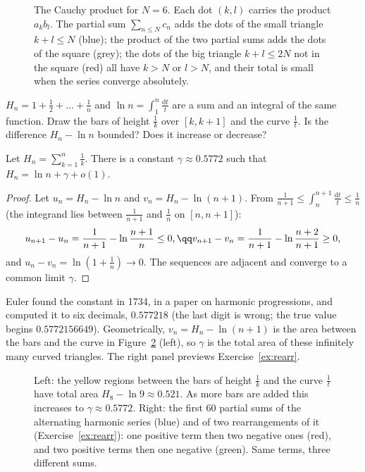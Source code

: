 \begin{figure}[ht]
\centering
{}
\caption{The Cauchy product for $N=6$. Each dot $(k,l)$ carries the product $a_kb_l$. The partial sum $\sum_{n\le N}c_n$ adds the dots of the small triangle $k+l\le N$ (blue); the product of the two partial sums adds the dots of the square (grey); the dots of the big triangle $k+l\le2N$ not in the square (red) all have $k>N$ or $l>N$, and their total is small when the series converge absolutely.}
\label{fig:cauchyprod}
\end{figure}

\begin{think}
$H_n=1+\frac12+\dots+\frac1n$ and $\ln n=\int_1^n\frac{\mathrm dt}t$ are a sum and an integral of the same function. Draw the bars of height $\frac1k$ over $[k,k+1]$ and the curve $\frac1t$. Is the difference $H_n-\ln n$ bounded? Does it increase or decrease?
\end{think}

\begin{proposition}\label{prop:gamma}
Let $H_n=\sum_{k=1}^n\frac1k$. There is a constant $\gamma\approx0.5772$ such that $H_n=\ln n+\gamma+o(1)$.
\end{proposition}
\begin{proof}
Let $u_n=H_n-\ln n$ and $v_n=H_n-\ln(n+1)$. From $\frac1{n+1}\le\int_n^{n+1}\frac{\mathrm dt}t\le\frac1n$ (the integrand lies between $\frac1{n+1}$ and $\frac1n$ on $[n,n+1]$):
\[
\begin{gathered}u_{n+1}-u_n=\frac1{n+1}-\ln\frac{n+1}n\le0,\qq v_{n+1}-v_n=\frac1{n+1}-\ln\frac{n+2}{n+1}\ge0,\end{gathered}
\]
and $u_n-v_n=\ln\left(1+\frac1n\right)\to0$. The sequences are adjacent and converge to a common limit $\gamma$.
\end{proof}

Euler found the constant in 1734, in a paper on harmonic progressions, and computed it to six decimals, $0.577218$ (the last digit is wrong; the
true value begins $0.5772156649$). Geometrically, $v_n=H_n-\ln(n+1)$ is the area between the bars and the curve in Figure~\ref{fig:gamma} (left), so $\gamma$ is the total area of these
infinitely many curved triangles. The right panel previews Exercise~\ref{ex:rearr}.

\begin{figure}[ht]
\centering
{}
\caption{Left: the yellow regions between the bars of height $\frac1k$ and the curve $\frac1t$ have total area $H_8-\ln9\approx0.521$. As more bars are added this increases to $\gamma\approx0.5772$. Right: the first $60$ partial sums of the alternating harmonic series (blue) and of two rearrangements of it (Exercise~\ref{ex:rearr}): one positive term then two negative ones (red), and two positive terms then one negative (green). Same terms, three different sums.}
\label{fig:gamma}
\end{figure}

